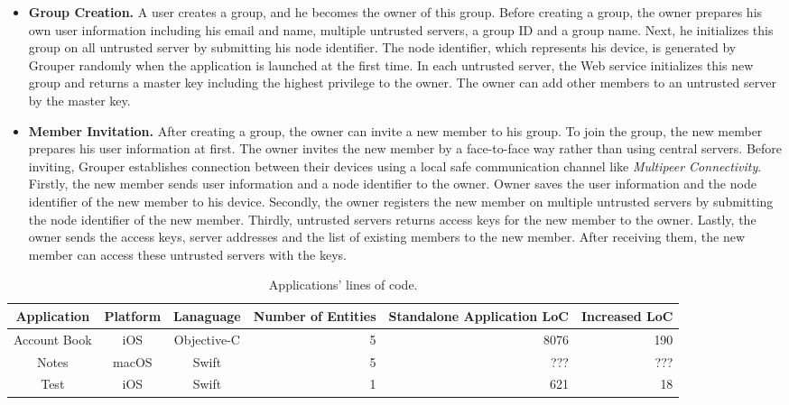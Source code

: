 \documentclass[twocolumn,10pt]{article}
\begin{document}
\begin{itemize}
	\setlength{\itemsep}{1pt}
	\setlength{\parskip}{0pt}
	\setlength{\parsep}{0pt}
	\item \textbf{Group Creation.}
	A user creates a group, and he becomes the owner of this group.  
	Before creating a group, the owner prepares his own user information including his email and name, multiple untrusted servers, a group ID and a group name. 
	Next, he initializes this group on all untrusted server by submitting his node identifier. 
	The node identifier, which represents his device, is generated by Grouper randomly when the application is launched at the first time. 
	In each untrusted server, the Web service initializes this new group and returns a master key including the highest privilege to the owner. 
	The owner can add other members to an untrusted server by the master key.
	\item \textbf{Member Invitation.} 
	After creating a group, the owner can invite a new member to his group. 
	To join the group, the new member prepares his user information at first. 
	The owner invites the new member by a face-to-face way rather than using central servers. 
	Before inviting, Grouper establishes connection between their devices using a local safe communication channel like \emph{Multipeer Connectivity}\cite{mc}. 
	Firstly, the new member sends user information and a node identifier to the owner. 
	Owner saves the user information and the node identifier of the new member to his device. 
	Secondly, the owner registers the new member on multiple untrusted servers by submitting the node identifier of the new member. 
	Thirdly, untrusted servers returns access keys for the new member to the owner. 
	Lastly, the owner sends the access keys, server addresses and the list of existing members to the new member. 
	After receiving them, the new member can access these untrusted servers with the keys.
\end{itemize}

\begin{table}[t]
	\small
	\centering
	\caption{Applications' lines of code.}
	\label{my-label}
	\begin{tabular}{cccccc}
		\hline
		\textbf{Application} & \textbf{Platform} & \textbf{Lanaguage} & \textbf{Number of Entities} & \textbf{Standalone Application LoC} & \textbf{Increased LoC} \\ \hline
		Account Book & iOS & Objective-C & \multicolumn{1}{r}{5} & \multicolumn{1}{r}{8076} & \multicolumn{1}{r}{190} \\ 
		Notes & macOS & Swift & \multicolumn{1}{r}{5} & \multicolumn{1}{r}{???} & \multicolumn{1}{r}{???} \\
		Test & iOS & Swift & \multicolumn{1}{r}{1} & \multicolumn{1}{r}{621} & \multicolumn{1}{r}{18} \\  \hline 
	\end{tabular}
\end{table}
\end{document}
